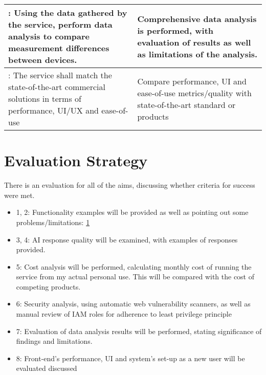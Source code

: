 \begin{center}
\begin{tabularx}{1\textwidth} {| >{\centering\arraybackslash}X 
        | >{\centering\arraybackslash}X 
        |}
    \hline
     7: Using the data gathered by the service, perform data analysis to compare measurement differences between devices. &  Comprehensive data analysis is performed, with evaluation of results as well as limitations of the analysis.\\
     \hline
     8: The service shall match the state-of-the-art commercial solutions in terms of performance, UI/UX and ease-of-use & Compare performance, UI and ease-of-use metrics/quality with state-of-the-art standard or products  \\
     \hline
    \end{tabularx}
\end{center}
\section{Evaluation Strategy}
There is an evaluation for all of the aims, discussing whether criteria for success were met.
\begin{itemize}
    \item 1, 2: Functionality examples will be provided as well as pointing out some problems/limitations: \ref{}
    \item 3, 4: AI response quality will be examined, with examples of responses provided. 
    \item 5: Cost analysis will be performed, calculating monthly cost of running the service from my actual personal use. This will be compared with the cost of competing products.
    \item 6: Security analysis, using automatic web vulnerability scanners, as well as manual review of IAM roles for adherence to least privilege principle
    \item 7: Evaluation of data analysis results will be performed, stating significance of findings and limitations.
    \item 8: Front-end's performance, UI and system's set-up as a new user will be evaluated discussed
\end{itemize}



